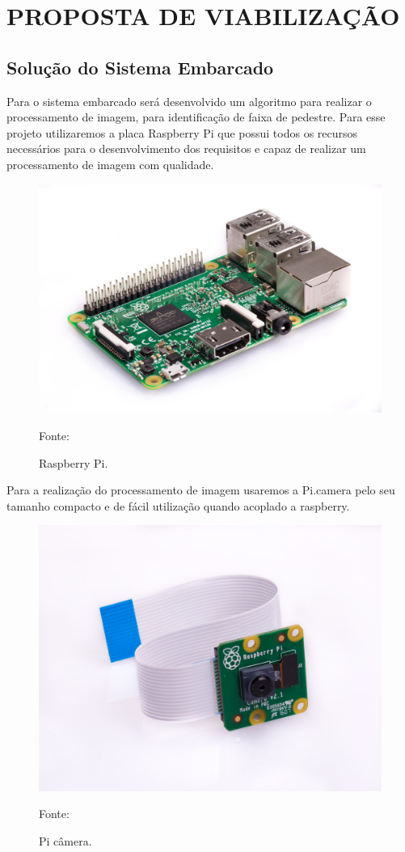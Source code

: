 \chapter[Proposta de viabilização]{PROPOSTA DE VIABILIZAÇÃO}

\section{Solução do Sistema Embarcado}

Para o sistema embarcado será desenvolvido um algoritmo para realizar o processamento de imagem, para identificação de faixa de pedestre. Para esse projeto utilizaremos a placa Raspberry Pi que possui todos os recursos necessários para o desenvolvimento dos requisitos e capaz de realizar um processamento de imagem com qualidade.

\begin{figure}[h]
\includegraphics[scale=0.2]{figuras/Capitulo4/rasp.jpg}
\centering
\caption{Raspberry Pi.}
\label{fig:rasp.jpg}
Fonte: \cite{rasp}
\end{figure}

Para a realização do processamento de imagem usaremos a Pi.camera pelo seu tamanho compacto e de fácil utilização quando acoplado a raspberry.
\begin{figure}[h]
\includegraphics[scale=0.2]{figuras/Capitulo4/camera.jpg}
\centering
\caption{Pi câmera.}
\label{fig:camera.jpg}
Fonte: \cite{camera}
\end{figure}

